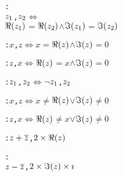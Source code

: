 \begin{alltt}
  : 
    \pvsid{(}\(z\sb{1}\), \(z\sb{2}\)\pvsid{)} \(\Leftrightarrow\)
     \(\Reonefn{z\sb{1}}\) \(=\) \(\Reonefn{z\sb{2}}\) \(\wedge\) \(\Imonefn{z\sb{1}}\) \(=\) \(\Imonefn{z\sb{2}}\)\vspace*{\pvsdeclspacing}

  :  \pvsid{(}\(x\), \(z\)\pvsid{)} \(\Leftrightarrow\) \(x\) \(=\) \(\Reonefn{z}\) \(\wedge\) \(\Imonefn{z}\) \(=\) \(0\)\vspace*{\pvsdeclspacing}

  :  \pvsid{(}\(z\), \(x\)\pvsid{)} \(\Leftrightarrow\) \(\Reonefn{z}\) \(=\) \(x\) \(\wedge\) \(\Imonefn{z}\) \(=\) \(0\)\vspace*{\pvsdeclspacing}

  :  \pvsid{(}\(z\sb{1}\), \(z\sb{2}\)\pvsid{)} \(\Leftrightarrow\) \(\neg\) \pvsid{(}\(z\sb{1}\), \(z\sb{2}\)\pvsid{)}\vspace*{\pvsdeclspacing}

  :  \pvsid{(}\(x\), \(z\)\pvsid{)} \(\Leftrightarrow\) \(x\) \(\neq\) \(\Reonefn{z}\) \(\vee\) \(\Imonefn{z}\) \(\neq\) \(0\)\vspace*{\pvsdeclspacing}

  :  \pvsid{(}\(z\), \(x\)\pvsid{)} \(\Leftrightarrow\) \(\Reonefn{z}\) \(\neq\) \(x\) \(\vee\) \(\Imonefn{z}\) \(\neq\) \(0\)\vspace*{\pvsdeclspacing}

   


   


   


   


   


   


  :  \pvsid{(}\(\opplustwofn{z}{\conjugateonefn{z}}\), \(\optimestwofn{2}{\Reonefn{z}}\)\pvsid{)}\vspace*{\pvsdeclspacing}

  : 
    \pvsid{(}\(\opdifferencetwofn{z}{\conjugateonefn{z}}\), \(\optimestwofn{\optimestwofn{2}{\Imonefn{z}}}{{\imath}}\)\pvsid{)}\vspace*{\pvsdeclspacing}


\end{alltt}
